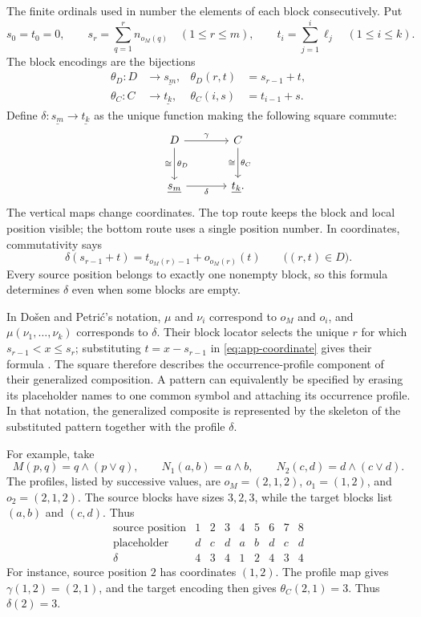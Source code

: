 \documentclass[11pt]{article}
\begin{document}
The finite ordinals used in \cite{DP} number the elements of each
block consecutively. Put
\[
 s_0=t_0=0,\qquad
 s_r=\sum_{q=1}^{r}n_{o_M(q)}\quad(1\leq r\leq m),\qquad
 t_i=\sum_{j=1}^{i}\ell_j\quad(1\leq i\leq k).
\]
The block encodings are the bijections
\[
 \begin{aligned}
 \theta_D:D&\longrightarrow\underline{s_m},
       &\theta_D(r,t)&=s_{r-1}+t,\\
 \theta_C:C&\longrightarrow\underline{t_k},
       &\theta_C(i,s)&=t_{i-1}+s.
 \end{aligned}
\]
Define $\delta:\underline{s_m}\to\underline{t_k}$ as the unique
function making the following square commute:
\begin{equation}\label{eq:app-ordinal}
\begin{tikzcd}[column sep=large,row sep=large]
 D\arrow[r,"\gamma"]\arrow[d,"\theta_D","\cong"']
    &C\arrow[d,"\theta_C","\cong"']\\
 \underline{s_m}\arrow[r,"\delta"']&\underline{t_k}.
\end{tikzcd}
\end{equation}
The vertical maps change coordinates. The top route keeps the block
and local position visible; the bottom route uses a single position
number. In coordinates, commutativity says
\begin{equation}\label{eq:app-coordinate}
 \delta(s_{r-1}+t)=t_{o_M(r)-1}+o_{o_M(r)}(t)
 \qquad\bigl((r,t)\in D\bigr).
\end{equation}
Every source position belongs to exactly one nonempty block, so this
formula determines $\delta$ even when some blocks are empty.

In Do\v{s}en and Petri\'c's notation, $\mu$ and $\nu_i$ correspond to
$o_M$ and $o_i$, and $\mu(\nu_1,\ldots,\nu_k)$ corresponds to $\delta$.
Their block locator selects the unique $r$ for which
$s_{r-1}<x\leq s_r$; substituting $t=x-s_{r-1}$ in
\eqref{eq:app-coordinate} gives their formula
\cite[\S2.5, p.~46]{DP}. The square therefore describes the
occurrence-profile component of their generalized composition.
A pattern can equivalently be specified by erasing its placeholder names to one common symbol and
attaching its occurrence profile. In that notation, the generalized
composite is represented by the skeleton of the substituted pattern
together with the profile $\delta$.

For example, take
\[
 M(p,q)=q\wedge(p\vee q),\qquad
 N_1(a,b)=a\wedge b,\qquad
 N_2(c,d)=d\wedge(c\vee d).
\]
The profiles, listed by successive values, are
$o_M=(2,1,2)$, $o_1=(1,2)$, and $o_2=(2,1,2)$.
The source blocks have sizes $3,2,3$, while the target blocks list
$(a,b)$ and $(c,d)$. Thus
\[
\begin{array}{c|ccc|cc|ccc}
 \text{source position}&1&2&3&4&5&6&7&8\\\hline
 \text{placeholder}&d&c&d&a&b&d&c&d\\
 \delta&4&3&4&1&2&4&3&4
\end{array}
\]
For instance, source position $2$ has coordinates $(1,2)$.
The profile map gives $\gamma(1,2)=(2,1)$, and the target encoding
then gives $\theta_C(2,1)=3$. Thus $\delta(2)=3$.
\end{document}
